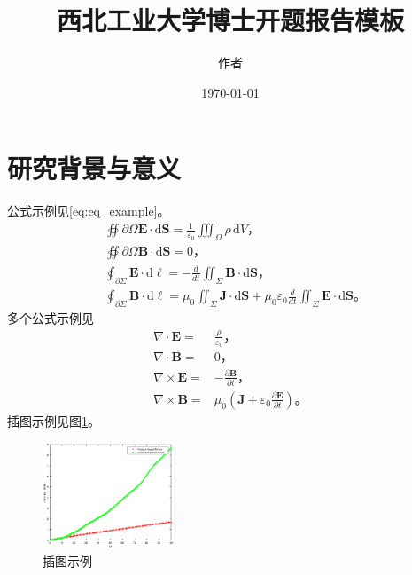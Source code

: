 \documentclass[a4paper,12pt]{NPUResearchProposal}
\begin{document}
\title{西北工业大学博士开题报告模板}

\author{作者}
\AppResearch %
\date{\today}		
\maketitle

\section{研究背景与意义}
\label{sec:background}
公式示例见\eqref{eq:eq_example}。
\begin{equation}
  \label{eq:eq_example}
  \begin{split}
    &\oiint{\scriptstyle\partial \Omega
    }\mathbf{E}\cdot\mathrm{d}\mathbf{S} = \frac{1}{\varepsilon_0}
    \iiint_\Omega \rho \,\mathrm{d}V\textit{，}\\
   & \oiint{\scriptstyle \partial \Omega
    }\mathbf{B}\cdot\mathrm{d}\mathbf{S} = 0\textit{，}\\
    &\oint_{\partial \Sigma} \mathbf{E} \cdot
    \mathrm{d}\boldsymbol{\ell} = - \frac{d}{dt} \iint_{\Sigma}
    \mathbf{B} \cdot \mathrm{d}\mathbf{S} \textit{，}\\
    &\oint_{\partial \Sigma} \mathbf{B} \cdot \mathrm{d}\boldsymbol{\ell} = \mu_0 \iint_{\Sigma} \mathbf{J} \cdot \mathrm{d}\mathbf{S} + \mu_0 \varepsilon_0 \frac{d}{dt} \iint_{\Sigma} \mathbf{E} \cdot \mathrm{d}\mathbf{S}\textit{。}
  \end{split}
\end{equation}
多个公式示例见
\begin{subequations}
  \begin{align}\label{eq:eq_example2}
    \nabla \cdot \mathbf{E} = &\frac {\rho} {\varepsilon_0}\textit{，}\\
    \nabla \cdot \mathbf{B} =& 0\textit{，}\\
    \nabla \times \mathbf{E} =& -\frac{\partial \mathbf{B}} {\partial
      t}\textit{，}\\
    \nabla \times \mathbf{B} = &\mu_0\left(\mathbf{J} + \varepsilon_0 \frac{\partial \mathbf{E}} {\partial t} \right) \textit{。}
  \end{align}
\end{subequations}
插图示例见图\ref{fig:fig_example}。
\begin{figure}[!h]
  \centering
  \includegraphics[width=0.35\textwidth]{example.eps}
  \caption{插图示例}
  \label{fig:fig_example}
\end{figure}
\end{document}
